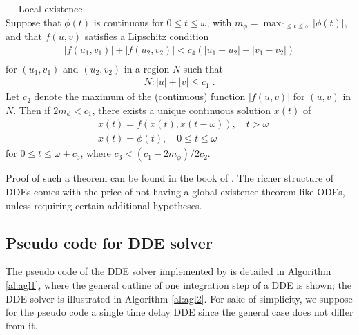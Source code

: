 \begin{theorem} \label{the:local_exist}
\citet{Cook_book_ref_dde} --- Local existence\\
Suppose that $\phi(t)$ is continuous for $0 \leq t \leq \omega$, with $m_{\phi} = \max_{0 \leq t \leq \omega} \left| \phi(t) \right|$, and that $f(u,v)$ satisfies a Lipschitz condition
\begin{equation}
\begin{aligned}
  \left| f(u_1,v_1) \right| + \left| f(u_2,v_2) \right| < c_4 ( \left| u_1 -u_2 \right| + \left| v_1 -v_2 \right|) \\
\end{aligned}
\end{equation}
for $(u_1,v_1)$ and $(u_2,v_2)$ in a region $N$ such that
\begin{equation*}
\begin{aligned}
  N :   \left| u \right| +   \left| v \right| \leq c_1 \; .
\end{aligned}
\end{equation*}
 Let $c_2$ denote the maximum of the (continuous) function $ \left| f(u,v) \right|$ for $(u,v)$ in $N$. Then if $2m_{\phi} < c_1$, there exists a unique continuous solution $x(t)$ of 
 \begin{equation}
\begin{aligned}
 & \dot{x}(t) = f(x(t), x(t-\omega)), \quad t > \omega \\
& x(t) = \phi(t), \quad 0 \leq t \leq \omega
\label{eqn:equationtheorem}
\end{aligned}
\end{equation}
for $0 \leq t \leq \omega + c_3$, where $c_3 < (c_1 - 2m_{\phi})/2c_2$.
\end{theorem}

Proof of such a theorem can be found in the book of \cite{Cook_book_ref_dde}. The richer structure of DDEs comes with the price of not having a global existence theorem like ODEs, unless requiring certain additional hypotheses.

\subsection{Pseudo code for DDE solver}
The pseudo code of the DDE solver implemented by  \citet{numerical_dde} is detailed in Algorithm \ref{al:agl1}, where the general outline of one integration step of a DDE is shown; the DDE solver is illustrated in Algorithm \ref{al:agl2}. For sake of simplicity, we suppose for the pseudo code a single time delay DDE since the general case does not differ from it.

